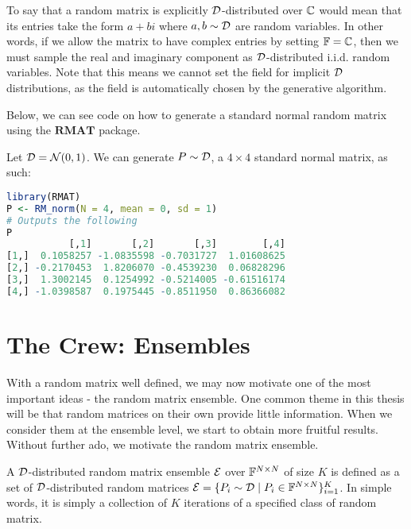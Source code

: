 \begin{remark}
To say that a random matrix is explicitly $\mathcal{D}$-distributed over $\mathbb{C}$ would mean that its entries take the form $a + bi$ where $a,b \sim \mathcal{D}$ are random variables.
In other words, if we allow the matrix to have complex entries by setting $\mathbb{F} = \mathbb{C}$, then we must sample the real and imaginary component as $\mathcal{D}$-distributed i.i.d. random variables.
Note that this means we cannot set the field for implicit $\mathcal{D}$ distributions, as the field is automatically chosen by the generative algorithm.
\end{remark}

\medskip
\noindent Below, we can see code on how to generate a standard normal random matrix using the $\textbf{RMAT}$ package.
\begin{code}
Let $\mathcal{D} = \mathcal{N}(0,1)$. We can generate $P \sim \mathcal{D}$, a $4 \times 4$ standard normal matrix, as such:
\end{code}

\begin{lstlisting}[language=R]
library(RMAT)
P <- RM_norm(N = 4, mean = 0, sd = 1)
# Outputs the following
P
           [,1]       [,2]       [,3]        [,4]
[1,]  0.1058257 -1.0835598 -0.7031727  1.01608625
[2,] -0.2170453  1.8206070 -0.4539230  0.06828296
[3,]  1.3002145  0.1254992 -0.5214005 -0.61516174
[4,] -1.0398587  0.1975445 -0.8511950  0.86366082
\end{lstlisting}


\newpage


\section{The Crew: Ensembles}

With a random matrix well defined, we may now motivate one of the most important ideas - the random matrix ensemble. One common theme in this thesis will be that random matrices on their own provide little information. When we consider them at the ensemble level, we start to obtain more fruitful results. Without further ado, we motivate the random matrix ensemble.

\begin{definition}
A $\mathcal{D}$-distributed random matrix ensemble $\mathcal{E}$ over $\mathbb{F}^{N \times N}$ of size $K$ is defined as a set of $\mathcal{D}$-distributed random matrices $\mathcal{E} = \{P_i \sim \mathcal{D} \mid P_i \in \mathbb{F}^{N \times N}\}_{i = 1}^K$. In simple words, it is simply a collection of $K$ iterations of a specified class of random matrix.
\end{definition}

